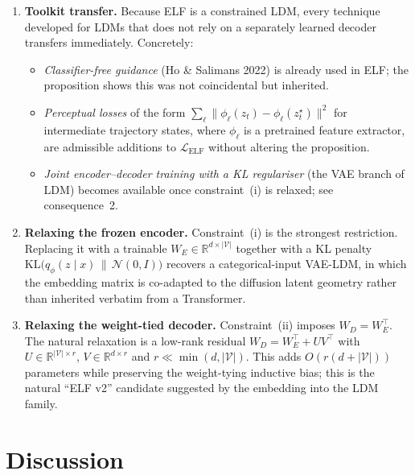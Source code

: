 \documentclass[11pt]{article}
\begin{document}
\begin{enumerate}
  \item \textbf{Toolkit transfer.} Because ELF is a constrained LDM, every
        technique developed for LDMs that does not rely on a separately
        learned decoder transfers immediately. Concretely:
        \begin{itemize}
          \item \emph{Classifier-free guidance} (Ho \& Salimans 2022) is
                already used in ELF; the proposition shows this was not
                coincidental but inherited.
          \item \emph{Perceptual losses} of the form
                $\sum_{\ell}\|\phi_{\ell}(z_{t}) - \phi_{\ell}(z_{t}^{\star})\|^{2}$
                for intermediate trajectory states, where $\phi_{\ell}$ is a
                pretrained feature extractor, are admissible additions to
                $\mathcal{L}_{\mathrm{ELF}}$ without altering the proposition.
          \item \emph{Joint encoder--decoder training with a KL
                regulariser} (the VAE branch of LDM) becomes available
                once constraint~(i) is relaxed; see consequence~2.
        \end{itemize}
  \item \textbf{Relaxing the frozen encoder.} Constraint~(i) is the
        strongest restriction. Replacing it with a trainable
        $W_{E}\in\mathbb{R}^{d\times|\mathcal{V}|}$ together with a KL
        penalty
        $\mathrm{KL}\bigl(q_{\phi}(z\mid x)\,\|\,\mathcal{N}(0,I)\bigr)$
        recovers a categorical-input VAE-LDM, in which the embedding
        matrix is co-adapted to the diffusion latent geometry rather than
        inherited verbatim from a Transformer.
  \item \textbf{Relaxing the weight-tied decoder.} Constraint~(ii) imposes
        $W_{D} = W_{E}^{\top}$. The natural relaxation is a low-rank
        residual $W_{D} = W_{E}^{\top} + UV^{\top}$ with
        $U\in\mathbb{R}^{|\mathcal{V}|\times r}$,
        $V\in\mathbb{R}^{d\times r}$ and $r \ll \min(d,|\mathcal{V}|)$.
        This adds $O(r(d+|\mathcal{V}|))$ parameters while preserving the
        weight-tying inductive bias; this is the natural ``ELF v2''
        candidate suggested by the embedding into the LDM family.
\end{enumerate}

\section*{Discussion}
\end{document}
